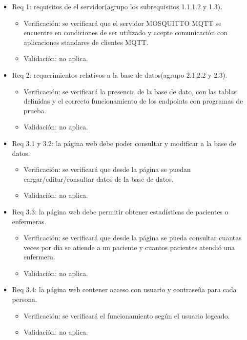 \documentclass[
11pt, %
]{charter}
\begin{document}
\begin{itemize}

\item Req 1: requisitos de el servidor(agrupo los subrequisitos 1.1,1.2 y 1.3).
	\begin{itemize}
	\item Verificación: se verificará que el servidor MOSQUITTO MQTT se encuentre en condiciones de ser utilizado y acepte comunicación con aplicaciones standares de clientes MQTT.
	\item Validación: no aplica.
	\end{itemize}


\item Req 2: requerimientos relativos a la base de datos(agrupo 2.1,2.2 y 2.3).
	\begin{itemize}
	\item Verificación: se verificará la presencia de la base de dato, con las tablas definidas y el correcto funcionamiento de los endpoints con programas de prueba.
	\item Validación: no aplica.
	\end{itemize}


\item Req 3.1 y 3.2: la página web debe poder consultar y modificar a la base de datos.
	\begin{itemize}
	\item Verificación: se verificará que desde la página se puedan cargar/editar/consultar datos de la base de datos.
	\item Validación:  no aplica.
	\end{itemize}
\item Req 3.3: la página web debe permitir obtener estadísticas de pacientes o enfermeras.
	\begin{itemize}
	\item Verificación: se verificará que desde la página se pueda consultar cuantas veces por día se atiende a un paciente y cuantos pacientes atendió una enfermera.
	\item Validación:  no aplica.
	\end{itemize}	
\item Req 3.4: la página web contener acceso con usuario y contraseña para cada persona.
	\begin{itemize}
	\item Verificación: se verificará el funcionamiento según el usuario logeado.
	\item Validación:  no aplica.
	\end{itemize}		
	


\end{itemize}
\end{document}
